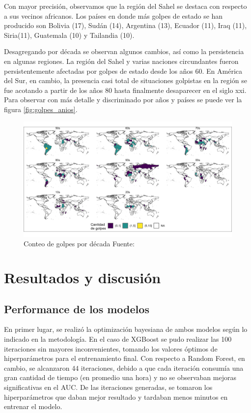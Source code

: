 \documentclass{article}
\begin{document}
Con mayor precisión, observamos que la región del Sahel se destaca con respecto a sus
vecinos africanos. Los países en donde más golpes de estado se han producido son
Bolivia (17), Sudán (14), Argentina (13), Ecuador (11), Iraq (11), Siria(11), 
Guatemala (10) y Tailandia (10).

Desagregando por década se observan algunos cambios, así como la persistencia en 
algunas regiones. La región del Sahel y varias naciones circundantes fueron 
persistentemente afectadas por golpes de estado desde los años 60. En América del 
Sur, en cambio, la presencia casi total de situaciones golpistas en la región se 
fue acotando a partir de los años 80 hasta finalmente desaparecer en el siglo 
xxi. Para observar con más detalle y discriminado por años y países se puede ver 
la figura \ref{fig:golpes_anios}.

\begin{figure}[H]
  \centering  
  \includegraphics[width=1\textwidth]{3_golpes_decadas.png}
  \caption{Conteo de golpes por década Fuente:\cite{Pow11} \label{fig:golpes_decadas}}
\end{figure}

\section{Resultados y discusión}

\subsection{Performance de los modelos}
En primer lugar, se realizó la optimización bayesiana de ambos modelos según lo indicado
en la metodología. En el caso de XGBoost se pudo realizar las 100 iteraciones sin mayores
inconvenientes, tomando los valores óptimos de hiperparámetros para el entrenamiento 
final. Con respecto a Random Forest, en cambio, se alcanzaron 44 iteraciones, debido a que cada
iteración consumía una gran cantidad de tiempo (en promedio una hora) y no se observaban
mejoras significativas en el AUC. De las iteraciones generadas, se tomaron los hiperparámetros
que daban mejor resultado y tardaban menos minutos en entrenar el modelo.
\end{document}
